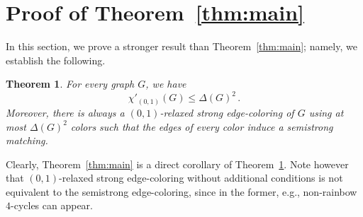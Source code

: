 \documentclass[12pt,a4paper]{article}
\newtheorem{theorem}{Theorem}
\begin{document}



\section{Proof of Theorem~\ref{thm:main}}
\label{sec:gen}


In this section, we prove a stronger result than Theorem~\ref{thm:main}; 
namely, we establish the following.
\begin{theorem}
	\label{thm:s01}
	For every graph $G$, we have
	$$
		\chi'_{(0,1)}(G) \le \Delta(G)^2\,.
	$$
	Moreover, there is always a $(0,1)$-relaxed strong edge-coloring of $G$ using at most $\Delta(G)^2$ colors
	such that the edges of every color induce a semistrong matching.
\end{theorem}

Clearly, Theorem~\ref{thm:main} is a direct corollary of Theorem~\ref{thm:s01}.
Note however that $(0,1)$-relaxed strong edge-coloring without additional conditions 
is not equivalent to the semistrong edge-coloring, since in the former, e.g., non-rainbow $4$-cycles can appear.
\end{document}
